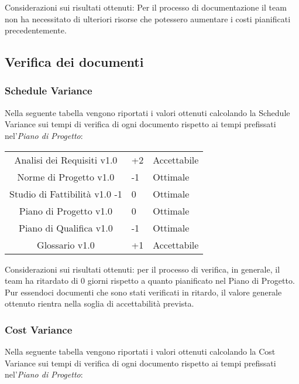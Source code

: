 
Considerazioni sui risultati ottenuti: Per il processo di documentazione il team non ha necessitato di ulteriori risorse che potessero aumentare i costi pianificati precedentemente.

\subsection{Verifica dei documenti}
\subsubsection{Schedule Variance}
Nella seguente tabella vengono riportati i valori ottenuti calcolando la Schedule Variance sui tempi di verifica di ogni documento rispetto ai tempi prefissati nel'\textit{Piano di Progetto}:

{
	\centering
	\begin{tabular}{| c | R{0.5cm} | C{3cm} |}
		\hline
		Analisi dei Requisiti v1.0 & +2 & Accettabile \\
		Norme di Progetto v1.0 & -1 & Ottimale \\
		Studio di Fattibilità v1.0 -1 &  0 &  Ottimale \\
		Piano di Progetto v1.0 &  0 &  Ottimale\\
		Piano di Qualifica v1.0 & -1 & Ottimale \\
		Glossario v1.0 & +1 & Accettabile\\	
		\hline
	\end{tabular}

}


Considerazioni sui risultati ottenuti: per il processo di verifica, in generale, il team ha ritardato di 0 giorni rispetto a quanto pianificato nel Piano di Progetto. Pur essendoci documenti che sono stati verificati in ritardo, il valore generale ottenuto rientra nella soglia di accettabilità prevista.

\subsubsection{Cost Variance}
Nella seguente tabella vengono riportati i valori ottenuti calcolando la Cost Variance sui tempi di verifica di ogni documento rispetto ai tempi prefissati nel'\textit{Piano di Progetto}:

